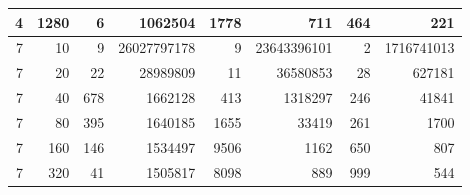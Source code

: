 \begin{table}[p]
\begin{minipage}[c]{0.49\textwidth}
\begin{tabular}{|rr|rr|rr|rr|}
\num{4} & \num{1280} &    \num{6} &    \num{1062504} &  \num{1778} &        \num{711} &  \num{464} &     \num{221} \\
\hline
\num{7} &   \num{10} &   \num{9} & \num{26027797178} &    \num{9} & \num{23643396101} &   \num{2} & \num{1716741013} \\
\num{7} &   \num{20} &  \num{22} &    \num{28989809} &   \num{11} &    \num{36580853} &  \num{28} &     \num{627181} \\
\num{7} &   \num{40} & \num{678} &     \num{1662128} &  \num{413} &     \num{1318297} & \num{246} &      \num{41841} \\
\num{7} &   \num{80} & \num{395} &     \num{1640185} & \num{1655} &       \num{33419} & \num{261} &       \num{1700} \\
\num{7} &  \num{160} & \num{146} &     \num{1534497} & \num{9506} &        \num{1162} & \num{650} &        \num{807} \\
\num{7} &  \num{320} &  \num{41} &     \num{1505817} & \num{8098} &         \num{889} & \num{999} &        \num{544} \\

\end{tabular}
\end{minipage}
\end{table}
